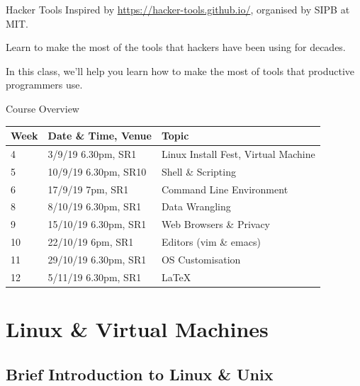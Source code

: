 \documentclass[11pt]{beamer}
\begin{document}
\begin{frame}{Hacker Tools}
  Inspired by \url{https://hacker-tools.github.io/}, organised by SIPB at MIT.

  Learn to make the most of the tools that hackers have been using for decades.

  In this class, we'll help you learn how to make the most of tools that productive programmers use.
\end{frame}

\begin{frame}{Course Overview}
  \begin{center}
    \begin{tabularx}{\textwidth}{l|l|X}
      \textbf{Week} & \textbf{Date \& Time, Venue} & \textbf{Topic}                      \\ \hline
      4             & 3/9/19 6.30pm, SR1           & Linux Install Fest, Virtual Machine \\ \hline
      5             & 10/9/19 6.30pm, SR10         & Shell \& Scripting                  \\ \hline
      6             & 17/9/19 7pm, SR1             & Command Line Environment            \\ \hline
      8             & 8/10/19 6.30pm, SR1          & Data Wrangling                      \\ \hline
      9             & 15/10/19 6.30pm, SR1         & Web Browsers \& Privacy             \\ \hline
      10            & 22/10/19 6pm, SR1            & Editors (vim \& emacs)              \\ \hline
      11            & 29/10/19 6.30pm, SR1         & OS Customisation                    \\ \hline
      12            & 5/11/19 6.30pm, SR1          & \LaTeX                              \\ \hline
    \end{tabularx}
  \end{center}
\end{frame}

\section{Linux \& Virtual Machines}
\subsection{Brief Introduction to Linux \& Unix}
\end{document}
